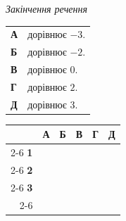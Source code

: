 \documentclass[14pt]{extarticle}
\begin{document}
\noindent
\begin{minipage}[t]{0.55\textwidth}
    \textit{Закінчення речення} \par \vspace{0.2cm}
    \begin{tabular}{ll}
    \textbf{А} & дорівнює $-3$. \\
    \textbf{Б} & дорівнює $-2$. \\
    \textbf{В} & дорівнює $0$. \\
    \textbf{Г} & дорівнює $2$. \\
    \textbf{Д} & дорівнює $3$. \\
    \end{tabular}
\end{minipage}%
\hfill
\begin{minipage}[t]{0.40\textwidth}
    \vspace{0.5cm} %
    \begin{flushright}
    \begingroup
    \setlength{\tabcolsep}{4pt}
    \renewcommand{\arraystretch}{1.2}
    \small
    \begin{tabular}{r|c|c|c|c|c|}
         \multicolumn{1}{c}{} & \multicolumn{1}{c}{\textbf{А}} & \multicolumn{1}{c}{\textbf{Б}} & \multicolumn{1}{c}{\textbf{В}} & \multicolumn{1}{c}{\textbf{Г}} & \multicolumn{1}{c}{\textbf{Д}} \\ \cline{2-6}
         \textbf{1} & & & & & \\ \cline{2-6}
         \textbf{2} & & & & & \\ \cline{2-6}
         \textbf{3} & & & & & \\ \cline{2-6}
    \end{tabular}
    \endgroup
    \end{flushright}
\end{minipage}

\vspace{0.7cm}
\end{document}

